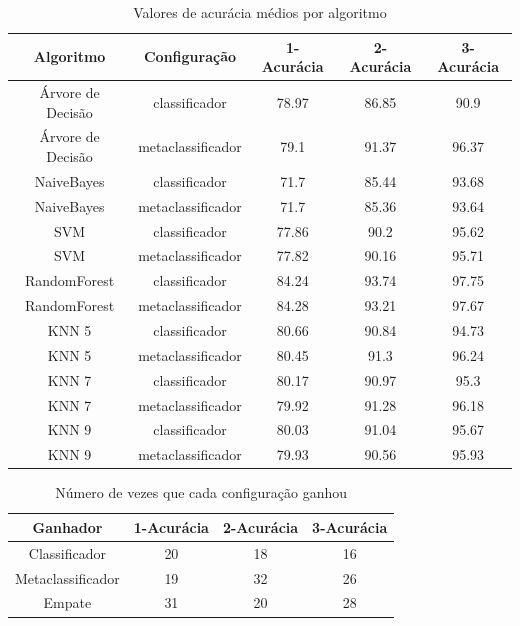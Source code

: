 \begin{table}[h!]
  \begin{center}
    \resizebox{\textwidth}{!} {
    \begin{tabular}{ccccc}
      \hline
      \textbf{Algoritmo} & \textbf{Configuração} & \textbf{1-Acurácia} & \textbf{2-Acurácia} & \textbf{3-Acurácia}\\
      \hline

Árvore de Decisão	&	classificador	&	78.97	&	86.85	&	90.9	\\
Árvore de Decisão	&	metaclassificador	&	79.1	&	91.37	&	96.37	\\
NaiveBayes	&	classificador	&	71.7	&	85.44	&	93.68	\\
NaiveBayes	&	metaclassificador	&	71.7	&	85.36	&	93.64	\\
SVM	&	classificador	&	77.86	&	90.2	&	95.62	\\
SVM	&	metaclassificador	&	77.82	&	90.16	&	95.71	\\
RandomForest	&	classificador	&	84.24	&	93.74	&	97.75	\\
RandomForest	&	metaclassificador	&	84.28	&	93.21	&	97.67	\\
KNN 5	&	classificador	&	80.66	&	90.84	&	94.73	\\
KNN 5	&	metaclassificador	&	80.45	&	91.3	&	96.24	\\
KNN 7	&	classificador	&	80.17	&	90.97	&	95.3	\\
KNN 7	&	metaclassificador	&	79.92	&	91.28	&	96.18	\\
KNN 9	&	classificador	&	80.03	&	91.04	&	95.67	\\
KNN 9	&	metaclassificador	&	79.93	&	90.56	&	95.93	\\

      \hline
    \end{tabular}
    }
    \caption{Valores de acurácia médios por algoritmo}
    \label{tab:acuracias}
  \end{center}
\end{table}

\begin{table}[h!]
  \begin{center}
    \begin{tabular}{cccc}
      \hline
      \textbf{Ganhador} & \textbf{1-Acurácia} & \textbf{2-Acurácia} & \textbf{3-Acurácia}\\
      \hline

Classificador	&	20	&	18	&	16	\\
Metaclassificador	&	19	&	32	&	26	\\
Empate	&	31	&	20	&	28	\\

      \hline
    \end{tabular}
    \caption{Número de vezes que cada configuração ganhou}
    \label{tab:acuracias2}
  \end{center}
\end{table}


